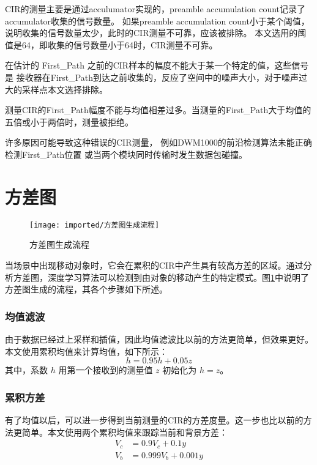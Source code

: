 CIR的测量主要是通过acculumator实现的，preamble accumulation count记录了accumulator收集的信号数量。
如果preamble accumulation count小于某个阈值，说明收集的信号数量太少，此时的CIR测量不可靠，应该被排除。
本文选用的阈值是64，即收集的信号数量小于64时，CIR测量不可靠。

在估计的 First\_Path 之前的CIR样本的幅度不能大于某一个特定的值，这些信号是
接收器在First\_Path到达之前收集的，反应了空间中的噪声大小，对于噪声过大的采样点本文选择排除。

测量CIR的First\_Path幅度不能与均值相差过多。当测量的First\_Path大于均值的五倍或小于两倍时，测量被拒绝。

许多原因可能导致这种错误的CIR测量，
例如DWM1000的前沿检测算法未能正确检测First\_Path位置
或当两个模块同时传输时发生数据包碰撞。


\section{方差图}
\begin{figure}[htbp]
    \centering
    \texttt{[image: imported/方差图生成流程]}
    \caption{\label{fig:variance_graph_pipline}方差图生成流程}
\end{figure}
当场景中出现移动对象时，它会在累积的CIR中产生具有较高方差的区域。通过分析方差图，深度学习算法可以检测到由对象的移动产生的特定模式。图\ref{fig:variance_graph_pipline}中说明了方差图生成的流程，其各个步骤如下所述。

\subsubsection{均值滤波}
由于数据已经过上采样和插值，因此均值滤波比以前\cite{Ledergerber}的方法更简单，但效果更好。本文使用累积均值来计算均值，如下所示：
\begin{equation}
    h = 0.95h + 0.05z
\end{equation}
其中，系数 \( h \) 用第一个接收到的测量值 \( z \) 初始化为 \( h = z \)。

\subsubsection{累积方差}
有了均值以后，可以进一步得到当前测量的CIR的方差度量。这一步也比以前\cite{Ledergerber}的方法更简单。本文使用两个累积均值来跟踪当前和背景方差：
\begin{align}
    V_c &= 0.9V_c + 0.1y \\
    V_b &= 0.999V_b + 0.001y
\end{align}

